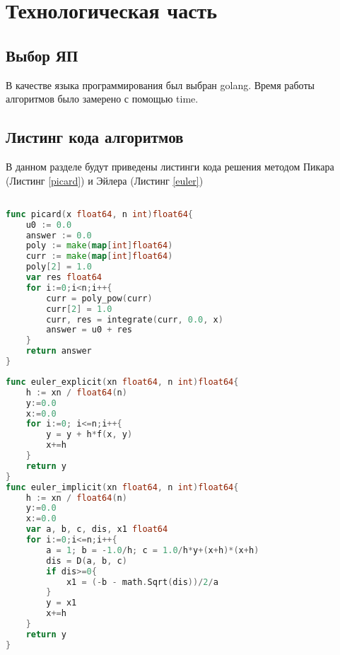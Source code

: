 \documentclass[12pt]{report}
\begin{document}
\chapter{Технологическая часть}

\section{Выбор ЯП}
В качестве языка программирования был выбран golang.
Время работы алгоритмов было замерено с помощью time. 
\section{Листинг кода алгоритмов}
В данном разделе будут приведены листинги кода решения методом Пикара (Листинг \ref{picard}) и Эйлера (Листинг \ref{euler})
\begin{lstlisting}[label=picard,caption = Метод Пикара, language = go]

func picard(x float64, n int)float64{
	u0 := 0.0
	answer := 0.0
	poly := make(map[int]float64)
	curr := make(map[int]float64)
	poly[2] = 1.0
	var res float64
	for i:=0;i<n;i++{
		curr = poly_pow(curr)
		curr[2] = 1.0
		curr, res = integrate(curr, 0.0, x)
		answer = u0 + res
	}
	return answer
}
\end{lstlisting}

\begin{lstlisting}[label=euler,caption = Явный и неявный методы Эйлера, language = go]
func euler_explicit(xn float64, n int)float64{
	h := xn / float64(n)
	y:=0.0 
	x:=0.0
	for i:=0; i<=n;i++{
		y = y + h*f(x, y)
		x+=h
	}
	return y
}
func euler_implicit(xn float64, n int)float64{
	h := xn / float64(n)
	y:=0.0 
	x:=0.0
	var a, b, c, dis, x1 float64
	for i:=0;i<=n;i++{
		a = 1; b = -1.0/h; c = 1.0/h*y+(x+h)*(x+h)
		dis = D(a, b, c)
		if dis>=0{
			x1 = (-b - math.Sqrt(dis))/2/a
		}
		y = x1
		x+=h
	}
	return y
}
\end{lstlisting}
\end{document}
